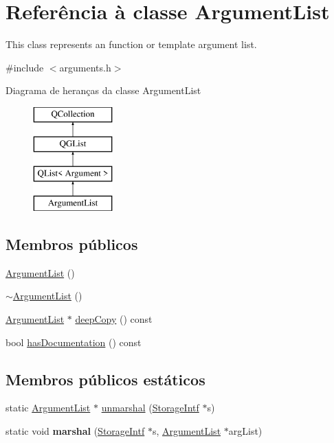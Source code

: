 \hypertarget{class_argument_list}{\section{Referência à classe Argument\-List}
\label{class_argument_list}
}


This class represents an function or template argument list.  




{\ttfamily \#include $<$arguments.\-h$>$}

Diagrama de heranças da classe Argument\-List\begin{figure}[H]
\begin{center}
\leavevmode
\includegraphics[height=4.000000cm]{class_argument_list}
\end{center}
\end{figure}
\subsection*{Membros públicos}
\begin{DoxyCompactItemize}
\item 
\hyperlink{class_argument_list_ab6e8f177f57931b8a4dc90e1bbf9bcf9}{Argument\-List} ()
\item 
\hyperlink{class_argument_list_a0e37716baa29c469bd5f1cc275481382}{$\sim$\-Argument\-List} ()
\item 
\hyperlink{class_argument_list}{Argument\-List} $\ast$ \hyperlink{class_argument_list_a2cfe4a2968e0438d00ef3b2405127fa6}{deep\-Copy} () const 
\item 
bool \hyperlink{class_argument_list_a585dcd381ab70014568db8ad457fc8b1}{has\-Documentation} () const 
\end{DoxyCompactItemize}
\subsection*{Membros públicos estáticos}
\begin{DoxyCompactItemize}
\item 
static \hyperlink{class_argument_list}{Argument\-List} $\ast$ \hyperlink{class_argument_list_a931d2e722c3f11a736082a0f46c22ba9}{unmarshal} (\hyperlink{class_storage_intf}{Storage\-Intf} $\ast$s)
\item 
\hypertarget{class_argument_list_a116d2c2c834eeb43147fd69379f36f9c}{static void {\bfseries marshal} (\hyperlink{class_storage_intf}{Storage\-Intf} $\ast$s, \hyperlink{class_argument_list}{Argument\-List} $\ast$arg\-List)}\label{class_argument_list_a116d2c2c834eeb43147fd69379f36f9c}

\end{DoxyCompactItemize}
